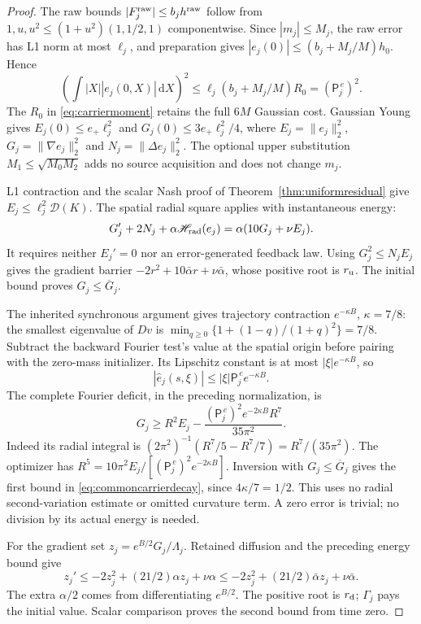 \documentclass[11pt]{article}
\numberwithin{equation}{section}
\newcommand{\dd}{\,\mathrm d}
\begin{document}
\begin{proof}
The raw bounds $|F_j^{\rm raw}|\le b_jh^{\rm raw}$ follow from
$1,u,u^2\le(1+u^2)(1,1/2,1)$ componentwise. Since $|m_j|\le M_j$,
the raw error has L1 norm at most $\ell_j$, and preparation gives
$|e_j(0)|\le(b_j+M_j/M)h_0$. Hence
\[
 \left(\int|X||e_j(0,X)|\dd X\right)^2
 \le\ell_j(b_j+M_j/M)R_0=(\mathsf P_j^{\,e})^2.
\]
The $R_0$ in \eqref{eq:carriermoment} retains the full $6M$ Gaussian
cost. Gaussian Young gives $E_j(0)\le e_+\ell_j^2$ and
$G_j(0)\le3e_+\ell_j^2/4$, where
$E_j=\|e_j\|_2^2$, $G_j=\|\nabla e_j\|_2^2$ and
$N_j=\|\Delta e_j\|_2^2$. The optional upper substitution
$M_1\le\sqrt{M_0M_2}$ adds no source acquisition and does not change $m_j$.

L1 contraction and the scalar Nash proof of
Theorem~\ref{thm:uniformresidual} give $E_j\le\ell_j^2\mathcal D(K)$.
The spatial radial square applies with instantaneous energy:
\begin{equation}\label{eq:centeredscalargradient}
 G_j'+2N_j+\alpha\mathscr H_{\rm rad}(e_j)
              =\alpha(10G_j+\nu E_j).
\end{equation}
It requires neither $E_j'=0$ nor an error-generated feedback law.
Using $G_j^2\le N_jE_j$ gives the gradient barrier
$-2r^2+10\bar\alpha r+\nu\bar\alpha$, whose positive root is
$r_{\rm u}$. The initial bound proves $G_j\le\overline G_j$.

The inherited synchronous argument gives trajectory contraction
$e^{-\kappa B}$, $\kappa=7/8$: the smallest eigenvalue of $Dv$ is
$\min_{q\ge0}\{1+(1-q)/(1+q)^2\}=7/8$.
Subtract the backward Fourier test's value at the spatial origin before
pairing with the zero-mass initializer. Its Lipschitz constant is at
most $|\xi|e^{-\kappa B}$, so
\[
 |\widehat e_j(s,\xi)|\le|\xi|\mathsf P_j^{\,e}e^{-\kappa B}.
\]
The complete Fourier deficit, in the preceding normalization, is
\begin{equation}\label{eq:centeredfourierdeficit}
 G_j\ge R^2E_j-
       \frac{(\mathsf P_j^{\,e})^2e^{-2\kappa B}R^7}{35\pi^2}.
\end{equation}
Indeed its radial integral is
$(2\pi^2)^{-1}(R^7/5-R^7/7)=R^7/(35\pi^2)$.
The optimizer has
$R^5=10\pi^2E_j/[(\mathsf P_j^{\,e})^2e^{-2\kappa B}]$.
Inversion with $G_j\le\overline G_j$ gives the first bound in
\eqref{eq:commoncarrierdecay}, since $4\kappa/7=1/2$.
This uses no radial second-variation estimate or omitted curvature term.
A zero error is trivial; no division by its actual energy is needed.

For the gradient set $z_j=e^{B/2}G_j/\Lambda_j$. Retained diffusion and
the preceding energy bound give
\[
 z_j'\le-2z_j^2+(21/2)\alpha z_j+\nu\alpha
       \le-2z_j^2+(21/2)\bar\alpha z_j+\nu\bar\alpha.
\]
The extra $\alpha/2$ comes from differentiating $e^{B/2}$.
The positive root is $r_{\rm d}$; $\Gamma_j$ pays the initial value.
Scalar comparison proves the second bound from time zero.
\end{proof}
\end{document}
